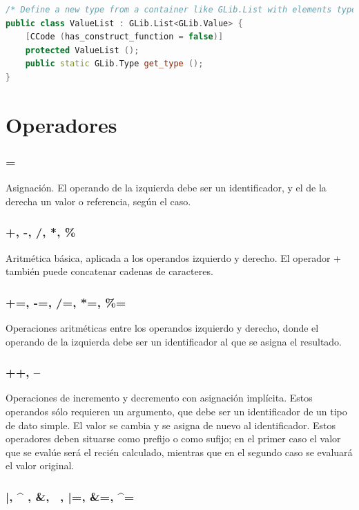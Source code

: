 \documentclass[12pt,twoside]{book}
\begin{document}
\begin{lstlisting}[language=C++] 
/* Define a new type from a container like GLib.List with elements type GLib.Value */
public class ValueList : GLib.List<GLib.Value> {
	[CCode (has_construct_function = false)]
	protected ValueList ();
	public static GLib.Type get_type ();
}
\end{lstlisting}

\section{Operadores}

\subsubsection{=}
Asignación. El operando de la izquierda debe ser un identificador, y el de la derecha un valor o referencia, según el caso.

\subsubsection{+, -, /, *, \%}

Aritmética básica, aplicada a los operandos izquierdo y derecho. El operador + también puede concatenar cadenas de caracteres.

\subsubsection{+=, -=, /=, *=, \%=}

Operaciones aritméticas entre los operandos izquierdo y derecho, donde el operando de la izquierda debe ser un identificador al que se asigna el resultado.

\subsubsection{++, --}

Operaciones de incremento y decremento con asignación implícita. Estos operandos sólo requieren un argumento, que debe ser un identificador de un tipo de dato simple. El valor se cambia y se asigna de nuevo al identificador. Estos operadores deben situarse como prefijo o como sufijo; en el primer caso el valor que se evalúe será el recién calculado, mientras que en el segundo caso se evaluará el valor original.

\subsubsection{|, \^{} , \&, ~, |=, \&=, \^{}=}
\end{document}
